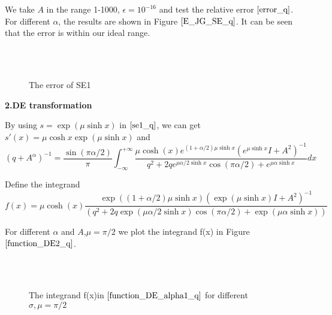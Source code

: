 We take $A$ in the range 1-1000,  $\epsilon=10^{-16}$ and test the relative error $\eqref{error_q}$. For different $\alpha $, the results are shown in Figure $\ref{E_JG_SE_q}$. It can be seen that the error is within our ideal range.
\begin{figure}[htbp]
	\centering
	~~
	~~
	\\
	~~
	~~
	\caption{The error of SE1}
	\label{E_JG_SE_q}
\end{figure}

\textbf{ 2.DE transformation}

By using $s=\exp(\mu\sinh x)$ in $\eqref{se1_q}$,  we can get $s'(x)=\mu \cosh x \exp(\mu \sinh x)$ and
\begin{equation}
	(q+{A}^{\alpha})^{-1}=\frac{\sin(\pi \alpha/2)}{\pi}\int_{-\infty}^{+\infty}
	\frac{\mu\cosh(x)e^{(1+\alpha/2)\mu\sinh x}(e^{\mu\sinh x}{I}+A^2)^{-1}}{q^2+2q e^{\mu \alpha/2 \sinh x}\cos(\pi\alpha/2)+e^{\mu\alpha\sinh x}}dx
	\label{de1_q}
\end{equation}

Define the integrand
\begin{equation}
	f(x)=\mu\cosh(x)\frac{\exp((1+\alpha/2)\mu\sinh x)(\exp(\mu\sinh x){I}+A^2)^{-1}}{(q^2+2q\exp(\mu \alpha /2\sinh x)\cos(\pi\alpha/2)+\exp(\mu\alpha\sinh x))}
	\label{function_DE_alpha1_q}
\end{equation}

For different $\alpha$ and $A$,$\mu=\pi/2$ we plot the integrand f(x) in Figure$\ref{function_DE2_q}$.
\begin{figure}[htbp]
	\centering
	~~
	~~
	\\
	~~
	~~
	\caption{The integrand f(x)in $\eqref{function_DE_alpha1_q}$ for different $\sigma,\mu=\pi/2$}
	\label{function_DE2_q}
\end{figure}

